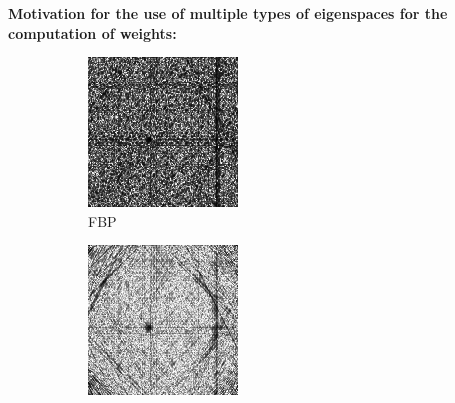 \documentclass[journal]{IEEEtran}
\begin{document}
\textbf{Motivation for the use of multiple types of eigenspaces for the computation of weights:}
\begin{figure}[!h]
    \begin{subfigure}[b]{0.24\linewidth}
        \includegraphics[width=\textwidth]{../images/potato/post_tci/comparison/weightsIm_fbp30.png}
        \caption{FBP}
    \end{subfigure}
    \begin{subfigure}[b]{0.24\linewidth}
        \includegraphics[width=\textwidth]{../images/potato/post_tci/comparison/weightsIm_cs_dct30.png}

\end{subfigure}
\end{figure}
\end{document}
